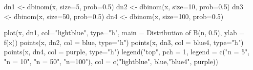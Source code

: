 \documentclass[
  letterpaper,
  DIV=11,
  numbers=noendperiod]{scrreprt}
\newenvironment{Shaded}{\begin{snugshade}}{\end{snugshade}}
\newcommand{\AttributeTok}[1]{\textcolor[rgb]{0.40,0.45,0.13}{#1}}
\newcommand{\DecValTok}[1]{\textcolor[rgb]{0.68,0.00,0.00}{#1}}
\newcommand{\FloatTok}[1]{\textcolor[rgb]{0.68,0.00,0.00}{#1}}
\newcommand{\FunctionTok}[1]{\textcolor[rgb]{0.28,0.35,0.67}{#1}}
\newcommand{\NormalTok}[1]{\textcolor[rgb]{0.00,0.23,0.31}{#1}}
\newcommand{\OtherTok}[1]{\textcolor[rgb]{0.00,0.23,0.31}{#1}}
\newcommand{\StringTok}[1]{\textcolor[rgb]{0.13,0.47,0.30}{#1}}
\begin{document}
\begin{Shaded}
\begin{Highlighting}[]
\NormalTok{dn1 }\OtherTok{\textless{}{-}} \FunctionTok{dbinom}\NormalTok{(x, }\AttributeTok{size=}\DecValTok{5}\NormalTok{, }\AttributeTok{prob=}\FloatTok{0.5}\NormalTok{)}
\NormalTok{dn2 }\OtherTok{\textless{}{-}} \FunctionTok{dbinom}\NormalTok{(x, }\AttributeTok{size=}\DecValTok{10}\NormalTok{, }\AttributeTok{prob=}\FloatTok{0.5}\NormalTok{)}
\NormalTok{dn3 }\OtherTok{\textless{}{-}} \FunctionTok{dbinom}\NormalTok{(x, }\AttributeTok{size=}\DecValTok{50}\NormalTok{, }\AttributeTok{prob=}\FloatTok{0.5}\NormalTok{)}
\NormalTok{dn4 }\OtherTok{\textless{}{-}} \FunctionTok{dbinom}\NormalTok{(x, }\AttributeTok{size=}\DecValTok{100}\NormalTok{, }\AttributeTok{prob=}\FloatTok{0.5}\NormalTok{)}
\end{Highlighting}
\end{Shaded}

\begin{Shaded}
\begin{Highlighting}[]
\FunctionTok{plot}\NormalTok{(x, dn1, }\AttributeTok{col=}\StringTok{"lightblue"}\NormalTok{, }\AttributeTok{type=}\StringTok{"h"}\NormalTok{,}
     \AttributeTok{main =} \StringTok{\textquotesingle{}Distribution of B(n, 0.5)\textquotesingle{}}\NormalTok{, }\AttributeTok{ylab =} \StringTok{\textquotesingle{}f(x)\textquotesingle{}}\NormalTok{)}
\FunctionTok{points}\NormalTok{(x, dn2, }\AttributeTok{col =} \StringTok{\textquotesingle{}blue\textquotesingle{}}\NormalTok{, }\AttributeTok{type=}\StringTok{"h"}\NormalTok{)}
\FunctionTok{points}\NormalTok{(x, dn3, }\AttributeTok{col =} \StringTok{\textquotesingle{}blue4\textquotesingle{}}\NormalTok{, }\AttributeTok{type=}\StringTok{"h"}\NormalTok{)}
\FunctionTok{points}\NormalTok{(x, dn4, }\AttributeTok{col =} \StringTok{\textquotesingle{}purple\textquotesingle{}}\NormalTok{,  }\AttributeTok{type=}\StringTok{"h"}\NormalTok{)}
\FunctionTok{legend}\NormalTok{(}\StringTok{"top"}\NormalTok{, }\AttributeTok{pch =} \DecValTok{1}\NormalTok{,}
       \AttributeTok{legend =} \FunctionTok{c}\NormalTok{(}\StringTok{"n = 5"}\NormalTok{, }\StringTok{"n = 10"}\NormalTok{, }\StringTok{"n = 50"}\NormalTok{, }\StringTok{"n=100"}\NormalTok{),}
       \AttributeTok{col =} \FunctionTok{c}\NormalTok{(}\StringTok{"lightblue"}\NormalTok{, }\StringTok{\textquotesingle{}blue\textquotesingle{}}\NormalTok{,}\StringTok{"blue4"}\NormalTok{, }\StringTok{\textquotesingle{}purple\textquotesingle{}}\NormalTok{))}
\end{Highlighting}
\end{Shaded}
\end{document}
